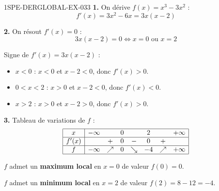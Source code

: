 \begin{corrige}{1SPE-DERGLOBAL-EX-033}
\textbf{1.} On dérive $f(x) = x^3 - 3x^2$ :
\[
f'(x) = 3x^2 - 6x = 3x(x - 2)
\]

\textbf{2.} On résout $f'(x) = 0$ :
\[
3x(x-2) = 0 \iff x = 0 \text{ ou } x = 2
\]

Signe de $f'(x) = 3x(x-2)$ :
\begin{itemize}
\item $x < 0$ : $x < 0$ et $x - 2 < 0$, donc $f'(x) > 0$.
\item $0 < x < 2$ : $x > 0$ et $x - 2 < 0$, donc $f'(x) < 0$.
\item $x > 2$ : $x > 0$ et $x - 2 > 0$, donc $f'(x) > 0$.
\end{itemize}

\textbf{3.} Tableau de variations de $f$ :
\[
\begin{array}{|c|ccccccc|}
\hline
x & -\infty & & 0 & & 2 & & +\infty \\
\hline
f'(x) & & + & 0 & - & 0 & + & \\
\hline
f & -\infty & \nearrow & 0 & \searrow & -4 & \nearrow & +\infty \\
\hline
\end{array}
\]

$f$ admet un \textbf{maximum local} en $x = 0$ de valeur $f(0) = \boxed{0}$.

$f$ admet un \textbf{minimum local} en $x = 2$ de valeur $f(2) = 8 - 12 = \boxed{-4}$.
\end{corrige}
